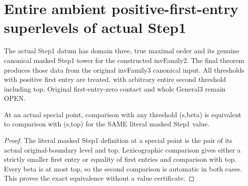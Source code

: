 \section{Entire ambient positive-first-entry superlevels of actual Step1}

The actual Step1 datum has domain three, true maximal order and its genuine
canonical masked Step1 tower for the constructed invFamily2. The final theorem
produces those data from the original invFamily3 canonical input. All thresholds
with positive first entry are treated, with arbitrary entire second threshold
including top. Original first-entry-zero contact and whole General3 remain OPEN.

\begin{lemma}
\label{hir:step-one-positive-special-top-baseline}
\leanok
{}
At an actual special point, comparison with any threshold (s,beta) is equivalent
to comparison with (s,top) for the SAME literal masked Step1 value.
\end{lemma}
\begin{proof}
The literal masked Step1 definition at a special point is the pair of its
actual original-boundary level and top. Lexicographic comparison gives either
a strictly smaller first entry or equality of first entries and comparison
with top. Every beta is at most top, so the second comparison is automatic
in both cases. This proves the exact equivalence without a value certificate.
\end{proof}

